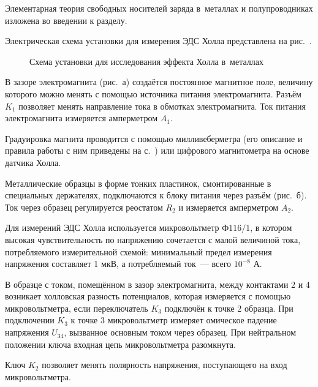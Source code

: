 


Элементарная теория свободных носителей заряда в~металлах и полупроводниках изложена во введении к разделу.

\experiment Электрическая схема установки для измерения ЭДС Холла представлена на рис.~.

\begin{figure}[h!]
	\caption{Схема установки для исследования эффекта Холла в~металлах}
\end{figure}

В зазоре электромагнита (рис.~а) создаётся постоянное магнитное поле, величину которого можно менять с помощью источника питания электромагнита. Разъём $K_1$ позволяет менять направление тока в обмотках электромагнита. Ток питания электромагнита измеряется амперметром $A_1$.

Градуировка магнита проводится с помощью милливеберметра (его описание и правила работы с ним приведены на с.~\pageref{MWB}) или цифрового магнитометра на основе датчика Холла.

Металлические образцы в форме тонких пластинок, смонтированные в специальных держателях, подключаются к блоку питания через разъём (рис.~б). Ток через образец регулируется реостатом $R_2$ и измеряется амперметром $A_2$.

Для измерений ЭДС Холла используется микровольтметр $\text{Ф}116/1$, в котором высокая чувствительность по напряжению сочетается с малой величиной тока, потребляемого измерительной схемой: минимальный предел измерения напряжения составляет 1 мкВ, а потребляемый ток~--- всего $10^{-8}$ А.

В образце с током, помещённом в зазор электромагнита, между контактами 2 и 4 возникает холловская разность потенциалов, которая измеряется с помощью микровольтметра, если переключатель $K_3$ подключён к точке 2 образца. При подключении $K_3$ к точке 3 микровольтметр измеряет омическое падение напряжения $U_{34}$, вызванное основным током через образец. При нейтральном положении ключа входная цепь микровольтметра разомкнута.

Ключ $K_2$ позволяет менять полярность напряжения, поступающего на вход микровольтметра.


